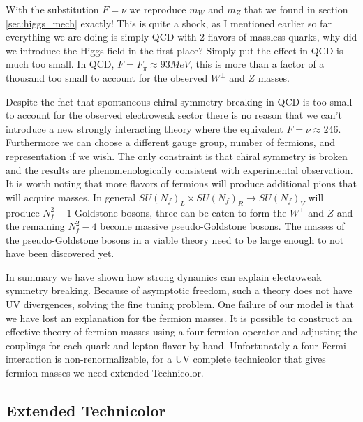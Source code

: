 With the substitution $F=\nu$ we reproduce $m_W$ and $m_Z$ that we found in section \ref{sec:higgs_mech} exactly!
This is quite a shock, as I mentioned earlier so far everything we are doing is simply QCD with 2 flavors of massless quarks, why did we introduce the Higgs field in the first place?
Simply put the effect in QCD is much too small.
In QCD, $F=F_\pi\approx93MeV$, this is more than a factor of a thousand too small to account for the observed $W^\pm$ and $Z$ masses.

Despite the fact that spontaneous chiral symmetry breaking in QCD is too small to account for the observed electroweak sector there is no reason that we can't introduce a new strongly interacting theory where the equivalent $F=\nu\approx246$.
Furthermore we can choose a different gauge group, number of fermions, and representation if we wish.
The only constraint is that chiral symmetry is broken and the results are phenomenologically consistent with experimental observation.
It is worth noting that more flavors of fermions will produce additional pions that will acquire masses.
In general $SU(N_f)_L\times SU(N_f)_R\rightarrow SU(N_f)_V$ will produce $N^2_f-1$ Goldstone bosons, three can be eaten to form the $W^\pm$ and $Z$ and the remaining $N_f^2-4$ become massive pseudo-Goldstone bosons.
The masses of the pseudo-Goldstone bosons in a viable theory need to be large enough to not have been discovered yet.

In summary we have shown how strong dynamics can explain electroweak symmetry breaking.
Because of asymptotic freedom, such a theory does not have UV divergences, solving the fine tuning problem.
One failure of our model is that we have lost an explanation for the fermion masses.
It is possible to construct an effective theory of fermion masses using a four fermion operator and adjusting the couplings for each quark and lepton flavor by hand.
Unfortunately a four-Fermi interaction is non-renormalizable, for a UV complete technicolor that gives fermion masses we need extended Technicolor.

\subsection{Extended Technicolor}

